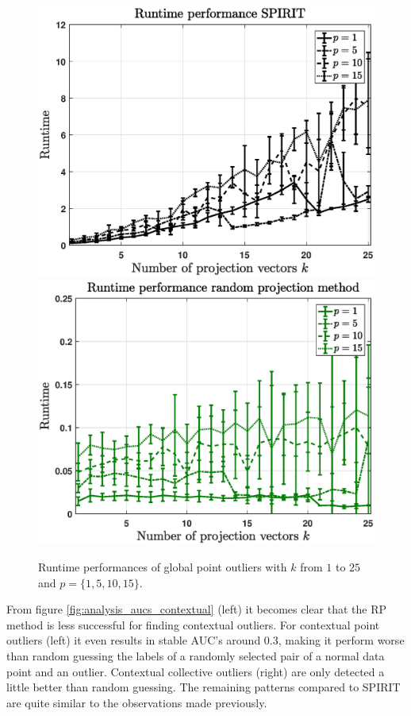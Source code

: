 \begin{figure}[h]
	\centering
	\vspace{0.25cm}
	\includegraphics[scale=0.36]{analysis/Runtimes_SPIRIT_point}
	\includegraphics[scale=0.36]{analysis/Runtimes_RP_point}
	\vspace{0.1cm}
	\caption{Runtime performances of global point outliers with $k$ from $1$ to $25$ and $p=\{1,5,10,15\}$.}
	\label{fig:analysis_runtimes_point}
	\vspace{0.25cm}
\end{figure}

From figure \ref{fig:analysis_aucs_contextual} (left) it becomes clear that the RP method is less successful for finding contextual outliers. For contextual point outliers (left) it even results in stable AUC's around $0.3$, making it perform worse than random guessing the labels of a randomly selected pair of a normal data point and an outlier. Contextual collective outliers (right) are only detected a little better than random guessing. The remaining patterns compared to SPIRIT are quite similar to the observations made previously.

